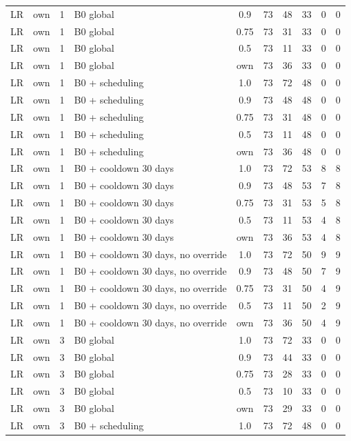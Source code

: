 \documentclass[10pt,onecolumn,letterpaper]{article}
\begin{document}
\begin{longtable}{lllp{4.4cm}cccccc}
LR & own & 1 & B0 global & 0.9 & 73 & 48 & 33 & 0 & 0 \\
LR & own & 1 & B0 global & 0.75 & 73 & 31 & 33 & 0 & 0 \\
LR & own & 1 & B0 global & 0.5 & 73 & 11 & 33 & 0 & 0 \\
LR & own & 1 & B0 global & own & 73 & 36 & 33 & 0 & 0 \\
LR & own & 1 & B0 + scheduling & 1.0 & 73 & 72 & 48 & 0 & 0 \\
LR & own & 1 & B0 + scheduling & 0.9 & 73 & 48 & 48 & 0 & 0 \\
LR & own & 1 & B0 + scheduling & 0.75 & 73 & 31 & 48 & 0 & 0 \\
LR & own & 1 & B0 + scheduling & 0.5 & 73 & 11 & 48 & 0 & 0 \\
LR & own & 1 & B0 + scheduling & own & 73 & 36 & 48 & 0 & 0 \\
LR & own & 1 & B0 + cooldown 30 days & 1.0 & 73 & 72 & 53 & 8 & 8 \\
LR & own & 1 & B0 + cooldown 30 days & 0.9 & 73 & 48 & 53 & 7 & 8 \\
LR & own & 1 & B0 + cooldown 30 days & 0.75 & 73 & 31 & 53 & 5 & 8 \\
LR & own & 1 & B0 + cooldown 30 days & 0.5 & 73 & 11 & 53 & 4 & 8 \\
LR & own & 1 & B0 + cooldown 30 days & own & 73 & 36 & 53 & 4 & 8 \\
LR & own & 1 & B0 + cooldown 30 days, no override & 1.0 & 73 & 72 & 50 & 9 & 9 \\
LR & own & 1 & B0 + cooldown 30 days, no override & 0.9 & 73 & 48 & 50 & 7 & 9 \\
LR & own & 1 & B0 + cooldown 30 days, no override & 0.75 & 73 & 31 & 50 & 4 & 9 \\
LR & own & 1 & B0 + cooldown 30 days, no override & 0.5 & 73 & 11 & 50 & 2 & 9 \\
LR & own & 1 & B0 + cooldown 30 days, no override & own & 73 & 36 & 50 & 4 & 9 \\
LR & own & 3 & B0 global & 1.0 & 73 & 72 & 33 & 0 & 0 \\
LR & own & 3 & B0 global & 0.9 & 73 & 44 & 33 & 0 & 0 \\
LR & own & 3 & B0 global & 0.75 & 73 & 28 & 33 & 0 & 0 \\
LR & own & 3 & B0 global & 0.5 & 73 & 10 & 33 & 0 & 0 \\
LR & own & 3 & B0 global & own & 73 & 29 & 33 & 0 & 0 \\
LR & own & 3 & B0 + scheduling & 1.0 & 73 & 72 & 48 & 0 & 0 \\

\end{longtable}
\end{document}
